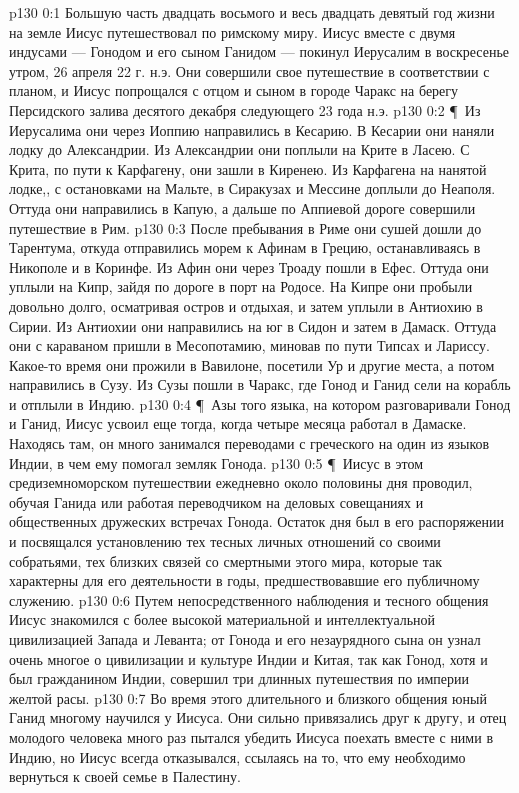 \vs p130 0:1 Большую часть двадцать восьмого и весь двадцать девятый год жизни на земле Иисус путешествовал по римскому миру. Иисус вместе с двумя индусами --- Гонодом и его сыном Ганидом --- покинул Иерусалим в воскресенье утром, 26 апреля 22 г. н.э. Они совершили свое путешествие в соответствии с планом, и Иисус попрощался с отцом и сыном в городе Чаракс на берегу Персидского залива десятого декабря следующего 23 года н.э.
\vs p130 0:2 \P\ Из Иерусалима они через Иоппию направились в Кесарию. В Кесарии они наняли лодку до Александрии. Из Александрии они поплыли на Крите в Ласею. С Крита, по пути к Карфагену, они зашли в Киренею. Из Карфагена на нанятой лодке,, с остановками на Мальте, в Сиракузах и Мессине доплыли до Неаполя. Оттуда они направились в Капую, а дальше по Аппиевой дороге совершили путешествие в Рим.
\vs p130 0:3 После пребывания в Риме они сушей дошли до Тарентума, откуда отправились морем к Афинам в Грецию, останавливаясь в Никополе и в Коринфе. Из Афин они через Троаду пошли в Ефес. Оттуда они уплыли на Кипр, зайдя по дороге в порт на Родосе. На Кипре они пробыли довольно долго, осматривая остров и отдыхая, и затем уплыли в Антиохию в Сирии. Из Антиохии они направились на юг в Сидон и затем в Дамаск. Оттуда они с караваном пришли в Месопотамию, миновав по пути Типсах и Лариссу. Какое\hyp{}то время они прожили в Вавилоне, посетили Ур и другие места, а потом направились в Сузу. Из Сузы пошли в Чаракс, где Гонод и Ганид сели на корабль и отплыли в Индию.
\vs p130 0:4 \P\ Азы того языка, на котором разговаривали Гонод и Ганид, Иисус усвоил еще тогда, когда четыре месяца работал в Дамаске. Находясь там, он много занимался переводами с греческого на один из языков Индии, в чем ему помогал земляк Гонода.
\vs p130 0:5 \P\ Иисус в этом средиземноморском путешествии ежедневно около половины дня проводил, обучая Ганида или работая переводчиком на деловых совещаниях и общественных дружеских встречах Гонода. Остаток дня был в его распоряжении и посвящался установлению тех тесных личных отношений со своими собратьями, тех близких связей со смертными этого мира, которые так характерны для его деятельности в годы, предшествовавшие его публичному служению.
\vs p130 0:6 Путем непосредственного наблюдения и тесного общения Иисус знакомился с более высокой материальной и интеллектуальной цивилизацией Запада и Леванта; от Гонода и его незаурядного сына он узнал очень многое о цивилизации и культуре Индии и Китая, так как Гонод, хотя и был гражданином Индии, совершил три длинных путешествия по империи желтой расы.
\vs p130 0:7 Во время этого длительного и близкого общения юный Ганид многому научился у Иисуса. Они сильно привязались друг к другу, и отец молодого человека много раз пытался убедить Иисуса поехать вместе с ними в Индию, но Иисус всегда отказывался, ссылаясь на то, что ему необходимо вернуться к своей семье в Палестину.
